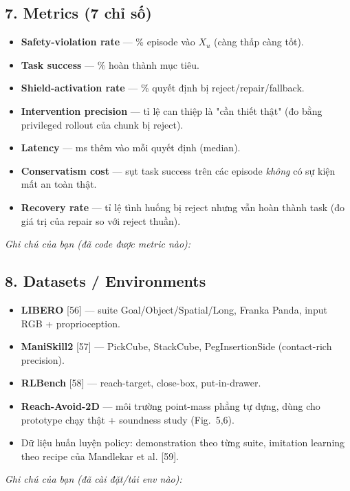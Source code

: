 \documentclass[a4paper,12pt]{article}
\begin{document}
\subsection*{7. Metrics (7 chỉ số)}
\begin{itemize}
  \item \textbf{Safety-violation rate} — \% episode vào $X_u$ (càng thấp càng tốt).
  \item \textbf{Task success} — \% hoàn thành mục tiêu.
  \item \textbf{Shield-activation rate} — \% quyết định bị reject/repair/fallback.
  \item \textbf{Intervention precision} — tỉ lệ can thiệp là "cần thiết thật" (đo bằng privileged rollout của chunk bị reject).
  \item \textbf{Latency} — ms thêm vào mỗi quyết định (median).
  \item \textbf{Conservatism cost} — sụt task success trên các episode \emph{không} có sự kiện mất an toàn thật.
  \item \textbf{Recovery rate} — tỉ lệ tình huống bị reject nhưng vẫn hoàn thành task (đo giá trị của repair so với reject thuần).
\end{itemize}
\begin{tasklist}
  \item[\square] \textit{Ghi chú của bạn (đã code được metric nào):} \underline{\hspace{10cm}}
\end{tasklist}

\subsection*{8. Datasets / Environments}
\begin{itemize}
  \item \textbf{LIBERO} [56] — suite Goal/Object/Spatial/Long, Franka Panda, input RGB + proprioception.
  \item \textbf{ManiSkill2} [57] — PickCube, StackCube, PegInsertionSide (contact-rich precision).
  \item \textbf{RLBench} [58] — reach-target, close-box, put-in-drawer.
  \item \textbf{Reach-Avoid-2D} — môi trường point-mass phẳng tự dựng, dùng cho prototype chạy thật + soundness study (Fig.~5,6).
  \item Dữ liệu huấn luyện policy: demonstration theo từng suite, imitation learning theo recipe của Mandlekar et al. [59].
\end{itemize}
\begin{tasklist}
  \item[\square] \textit{Ghi chú của bạn (đã cài đặt/tải env nào):} \underline{\hspace{10cm}}
\end{tasklist}
\end{document}
